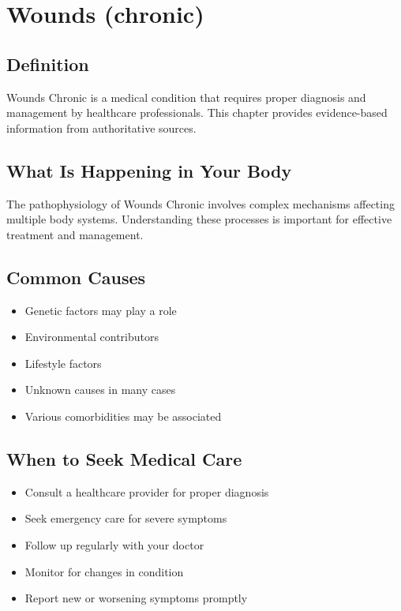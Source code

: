 
\chapter{Wounds (chronic)}

\section*{Definition}
Wounds Chronic is a medical condition that requires proper diagnosis and management by healthcare professionals. This chapter provides evidence-based information from authoritative sources.

\section*{What Is Happening in Your Body}
The pathophysiology of Wounds Chronic involves complex mechanisms affecting multiple body systems. Understanding these processes is important for effective treatment and management.

\section*{Common Causes}
\begin{itemize}
  \item Genetic factors may play a role
  \item Environmental contributors
  \item Lifestyle factors
  \item Unknown causes in many cases
  \item Various comorbidities may be associated
\end{itemize}

\section*{When to Seek Medical Care}
\begin{itemize}
  \item Consult a healthcare provider for proper diagnosis
  \item Seek emergency care for severe symptoms
  \item Follow up regularly with your doctor
  \item Monitor for changes in condition
  \item Report new or worsening symptoms promptly
\end{itemize}

